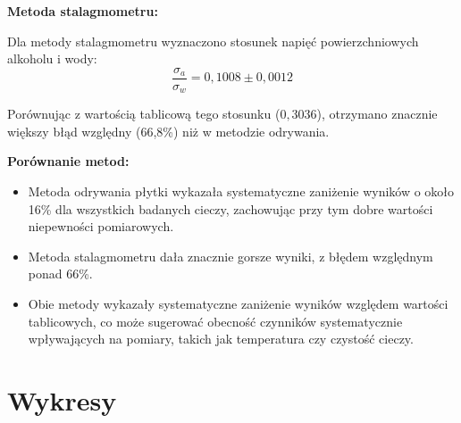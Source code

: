 \documentclass[a4paper,12pt]{article}
\begin{document}
\noindent\textbf{Metoda stalagmometru:}

Dla metody stalagmometru wyznaczono stosunek napięć powierzchniowych alkoholu i wody:
$$
    \frac{\sigma_a}{\sigma_w} = 0{,}1008 \pm 0{,}0012
$$

Porównując z wartością tablicową tego stosunku ($0{,}3036$), otrzymano znacznie większy błąd względny (66,8\%) niż w metodzie odrywania.

\noindent\textbf{Porównanie metod:}
\begin{itemize}
    \item Metoda odrywania płytki wykazała systematyczne zaniżenie wyników o około 16\% dla wszystkich badanych cieczy, zachowując przy tym dobre wartości niepewności pomiarowych.
    \item Metoda stalagmometru dała znacznie gorsze wyniki, z błędem względnym ponad 66\%.
    \item Obie metody wykazały systematyczne zaniżenie wyników względem wartości tablicowych, co może sugerować obecność czynników systematycznie wpływających na pomiary, takich jak temperatura czy czystość cieczy.
\end{itemize}

\section{Wykresy}



\end{document}

